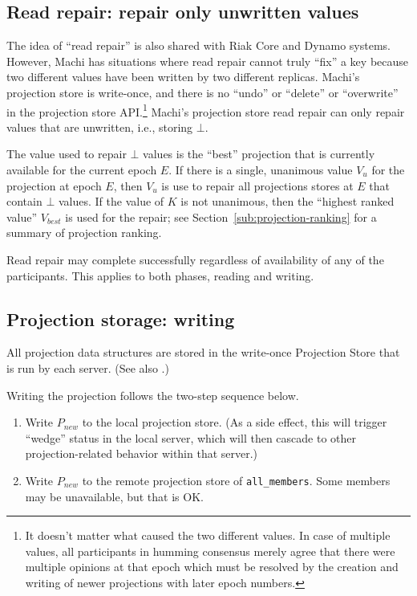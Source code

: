 \documentclass[preprint,10pt]{sigplanconf}
\begin{document}
\subsection{Read repair: repair only unwritten values}

The idea of ``read repair'' is also shared with Riak Core and Dynamo
systems.  However, Machi has situations where read repair cannot truly
``fix'' a key because two different values have been written by two
different replicas.
Machi's projection store is write-once, and there is no ``undo'' or
``delete'' or ``overwrite'' in the projection store API.\footnote{It doesn't
matter what caused the two different values.  In case of multiple
values, all participants in humming consensus merely agree that there
were multiple opinions at that epoch which must be resolved by the
creation and writing of newer projections with later epoch numbers.}
Machi's projection store read repair can only repair values that are
unwritten, i.e., storing $\bot$.

The value used to repair $\bot$ values is the ``best'' projection that
is currently available for the current epoch $E$.  If there is a single,
unanimous value $V_{u}$ for the projection at epoch $E$, then $V_{u}$
is use to repair all projections stores at $E$ that contain $\bot$
values.  If the value of $K$ is not unanimous, then the ``highest
ranked value'' $V_{best}$ is used for the repair; see
Section~\ref{sub:projection-ranking} for a summary of projection
ranking.

Read repair may complete successfully regardless of availability of any of the
participants.  This applies to both phases, reading and writing.

\subsection{Projection storage: writing}
\label{sub:proj-store-writing}

All projection data structures are stored in the write-once Projection
Store that is run by each server.  (See also \cite{machi-design}.)

Writing the projection follows the two-step sequence below.

\begin{enumerate}
\item Write $P_{new}$ to the local projection store.  (As a side
  effect,
  this will trigger
  ``wedge'' status in the local server, which will then cascade to other
  projection-related behavior within that server.)
\item Write $P_{new}$ to the remote projection store of {\tt all\_members}.
  Some members may be unavailable, but that is OK.
\end{enumerate}
\end{document}
